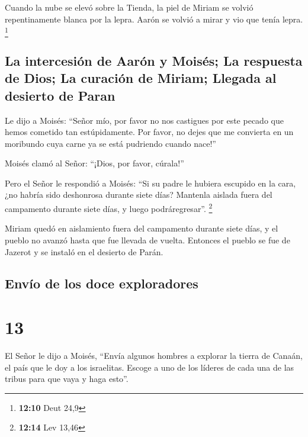 Cuando la nube se elevó sobre la Tienda, la piel de
Miriam se volvió repentinamente blanca por la lepra. Aarón se volvió a
mirar y vio que tenía lepra. \footnote{\textbf{12:10} Deut 24,9}

\hypertarget{la-intercesiuxf3n-de-aaruxf3n-y-moisuxe9s-la-respuesta-de-dios-la-curaciuxf3n-de-miriam-llegada-al-desierto-de-paran}{%
\subsection{La intercesión de Aarón y Moisés; La respuesta de Dios; La
curación de Miriam; Llegada al desierto de
Paran}\label{la-intercesiuxf3n-de-aaruxf3n-y-moisuxe9s-la-respuesta-de-dios-la-curaciuxf3n-de-miriam-llegada-al-desierto-de-paran}}

 Le dijo a Moisés: ``Señor mío, por favor no nos
castigues por este pecado que hemos cometido tan estúpidamente.
 Por favor, no dejes que me convierta en un moribundo
cuya carne ya se está pudriendo cuando nace!''

 Moisés clamó al Señor: ``¡Dios, por favor, cúrala!''

 Pero el Señor le respondió a Moisés: ``Si su padre le
hubiera escupido en la cara, ¿no habría sido deshonrosa durante siete
días? Mantenla aislada fuera del campamento durante siete días, y luego
podráregresar''. \footnote{\textbf{12:14} Lev 13,46}

 Miriam quedó en aislamiento fuera del campamento durante
siete días, y el pueblo no avanzó hasta que fue llevada de vuelta.
 Entonces el pueblo se fue de Jazerot y se instaló en el
desierto de Parán.

\hypertarget{envuxedo-de-los-doce-exploradores}{%
\subsection{Envío de los doce
exploradores}\label{envuxedo-de-los-doce-exploradores}}

\hypertarget{section-12}{%
\section{13}\label{section-12}}

 El Señor le dijo a Moisés,  ``Envía algunos
hombres a explorar la tierra de Canaán, el país que le doy a los
israelitas. Escoge a uno de los líderes de cada una de las tribus para
que vaya y haga esto''.


